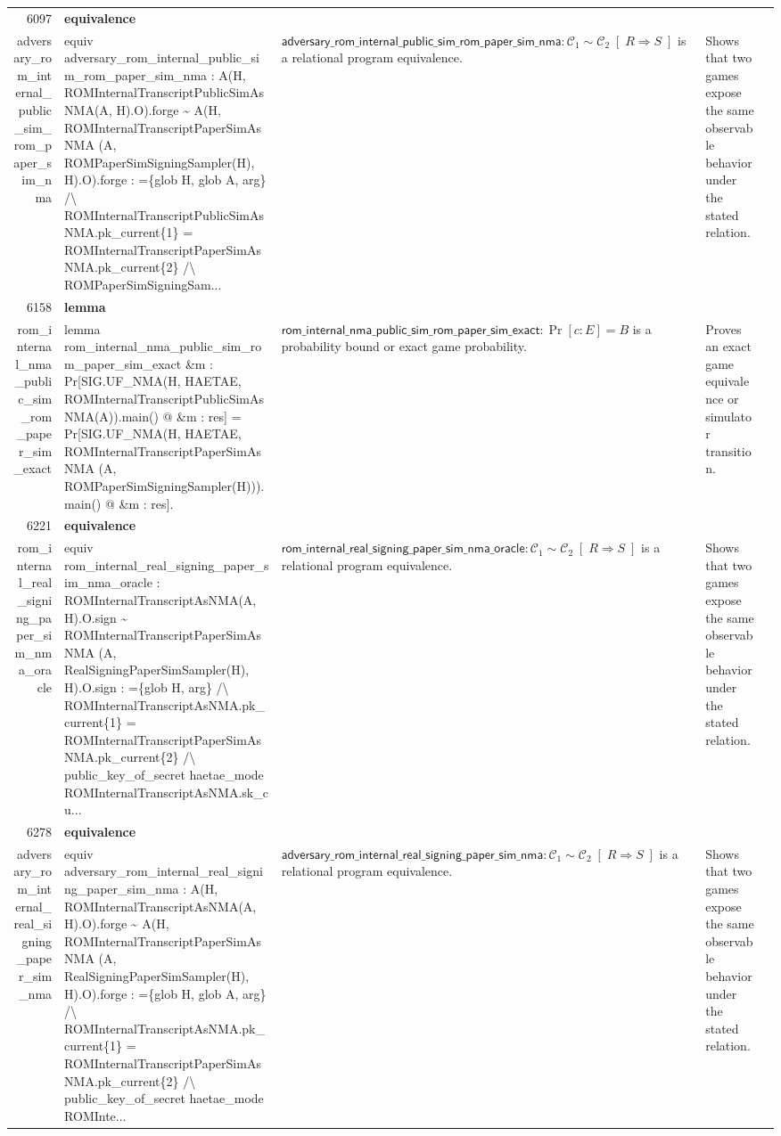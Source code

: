 \documentclass[10pt]{article}
\newcommand{\ec}[1]{\begingroup\ttfamily\scriptsize #1\endgroup}
\begin{document}
\begin{longtable}{r L{0.17\textwidth} L{0.26\textwidth} L{0.27\textwidth} L{0.20\textwidth}}
6097 & \textbf{equivalence}\\\ec{adversary\_rom\_internal\_public\_sim\_rom\_paper\_sim\_nma} & \ec{equiv adversary\_rom\_internal\_public\_sim\_rom\_paper\_sim\_nma : A(H, ROMInternalTranscriptPublicSimAsNMA(A, H).O).forge \textasciitilde{} A(H, ROMInternalTranscriptPaperSimAsNMA (A, ROMPaperSimSigningSampler(H), H).O).forge : =\{glob H, glob A, arg\} /\textbackslash{} ROMInternalTranscriptPublicSimAsNMA.pk\_current\{1\} = ROMInternalTranscriptPaperSimAsNMA.pk\_current\{2\} /\textbackslash{} ROMPaperSimSigningSam...} & \(\mathsf{adversary\_rom\_internal\_public\_sim\_rom\_paper\_sim\_nma} : \mathcal{C}_1 \sim \mathcal{C}_2 \;[\;R \Rightarrow S\;]\) is a relational program equivalence. & Shows that two games expose the same observable behavior under the stated relation. \\
6158 & \textbf{lemma}\\\ec{rom\_internal\_nma\_public\_sim\_rom\_paper\_sim\_exact} & \ec{lemma rom\_internal\_nma\_public\_sim\_rom\_paper\_sim\_exact \&m : Pr[SIG.UF\_NMA(H, HAETAE, ROMInternalTranscriptPublicSimAsNMA(A)).main() @ \&m : res] = Pr[SIG.UF\_NMA(H, HAETAE, ROMInternalTranscriptPaperSimAsNMA (A, ROMPaperSimSigningSampler(H))).main() @ \&m : res].} & \(\mathsf{rom\_internal\_nma\_public\_sim\_rom\_paper\_sim\_exact} : \Pr[c : E] = B\) is a probability bound or exact game probability. & Proves an exact game equivalence or simulator transition. \\
6221 & \textbf{equivalence}\\\ec{rom\_internal\_real\_signing\_paper\_sim\_nma\_oracle} & \ec{equiv rom\_internal\_real\_signing\_paper\_sim\_nma\_oracle : ROMInternalTranscriptAsNMA(A, H).O.sign \textasciitilde{} ROMInternalTranscriptPaperSimAsNMA (A, RealSigningPaperSimSampler(H), H).O.sign : =\{glob H, arg\} /\textbackslash{} ROMInternalTranscriptAsNMA.pk\_current\{1\} = ROMInternalTranscriptPaperSimAsNMA.pk\_current\{2\} /\textbackslash{} public\_key\_of\_secret haetae\_mode ROMInternalTranscriptAsNMA.sk\_cu...} & \(\mathsf{rom\_internal\_real\_signing\_paper\_sim\_nma\_oracle} : \mathcal{C}_1 \sim \mathcal{C}_2 \;[\;R \Rightarrow S\;]\) is a relational program equivalence. & Shows that two games expose the same observable behavior under the stated relation. \\
6278 & \textbf{equivalence}\\\ec{adversary\_rom\_internal\_real\_signing\_paper\_sim\_nma} & \ec{equiv adversary\_rom\_internal\_real\_signing\_paper\_sim\_nma : A(H, ROMInternalTranscriptAsNMA(A, H).O).forge \textasciitilde{} A(H, ROMInternalTranscriptPaperSimAsNMA (A, RealSigningPaperSimSampler(H), H).O).forge : =\{glob H, glob A, arg\} /\textbackslash{} ROMInternalTranscriptAsNMA.pk\_current\{1\} = ROMInternalTranscriptPaperSimAsNMA.pk\_current\{2\} /\textbackslash{} public\_key\_of\_secret haetae\_mode ROMInte...} & \(\mathsf{adversary\_rom\_internal\_real\_signing\_paper\_sim\_nma} : \mathcal{C}_1 \sim \mathcal{C}_2 \;[\;R \Rightarrow S\;]\) is a relational program equivalence. & Shows that two games expose the same observable behavior under the stated relation. \\

\end{longtable}
\end{document}
